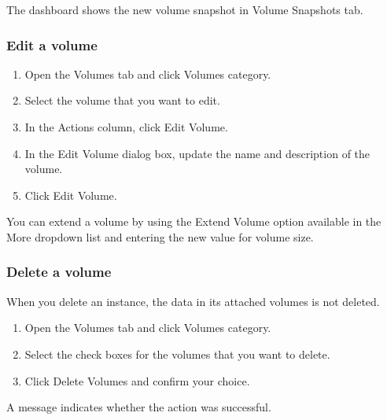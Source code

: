 The dashboard shows the new volume snapshot in Volume Snapshots tab.

\subsubsection{Edit a volume}\label{edit-a-volume}
\begin{enumerate}
\def\labelenumi{\arabic{enumi}.}
\item Open the Volumes tab and click Volumes category.
\item Select the volume that you want to edit.
\item In the Actions column, click Edit Volume.
\item In the Edit Volume dialog box, update the name and description
  of the volume.
\item Click Edit Volume.
\end{enumerate}

 You can extend a volume by using the Extend Volume
option available in the More dropdown list and entering the new value
for volume size.

\subsubsection{Delete a volume}\label{delete-a-volume}
When you delete an instance, the data in its attached volumes is not
deleted.

\begin{enumerate}
\item Open the Volumes tab and click Volumes
  category.
\item Select the check boxes for the volumes that you want to delete.
\item Click Delete Volumes and confirm your choice.
\end{enumerate}

A message indicates whether the action was successful.

